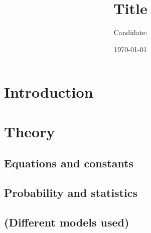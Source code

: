 \documentclass[reprint,english,notitlepage]{revtex4-1}
\begin{document}
\title{Title}   
\author{Candidate: }               
\date{\today}                             
\noaffiliation                            
\begin{abstract}                          



\end{abstract}
\maketitle
\tableofcontents
\section{Introduction}


\section{Theory}
\subsection{Equations and constants}


\subsection{Probability and statistics}


\subsection{(Different models used)}
\end{document}

